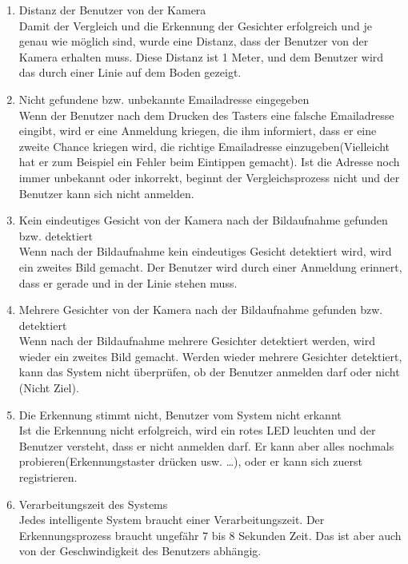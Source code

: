 \begin{enumerate}
	\item Distanz der Benutzer von der Kamera \\
	
	Damit der Vergleich und die Erkennung der Gesichter erfolgreich und je genau wie möglich sind, wurde eine Distanz, dass der Benutzer von der Kamera erhalten muss. Diese Distanz ist 1 Meter, und dem Benutzer wird das durch einer Linie auf dem Boden gezeigt.
	\item Nicht gefundene bzw. unbekannte Emailadresse eingegeben \\
	
	Wenn der Benutzer nach dem Drucken des Tasters eine falsche Emailadresse eingibt, wird er eine Anmeldung kriegen, die ihm informiert, dass er eine zweite Chance kriegen wird, die richtige Emailadresse einzugeben(Vielleicht hat er zum Beispiel ein Fehler beim Eintippen gemacht). Ist die Adresse noch immer unbekannt oder inkorrekt, beginnt der Vergleichsprozess nicht und der Benutzer kann sich nicht anmelden.
	\item Kein eindeutiges Gesicht von der Kamera nach der Bildaufnahme gefunden bzw. detektiert \\
	
	Wenn nach der Bildaufnahme kein eindeutiges Gesicht detektiert wird, wird ein zweites Bild gemacht. Der Benutzer wird durch einer Anmeldung erinnert, dass er gerade und in der Linie stehen muss.
	\item Mehrere Gesichter von der Kamera nach der Bildaufnahme gefunden bzw. detektiert \\
	
	Wenn nach der Bildaufnahme mehrere Gesichter detektiert werden, wird wieder ein zweites Bild gemacht. Werden wieder mehrere Gesichter detektiert, kann das System nicht überprüfen, ob der Benutzer anmelden darf oder nicht (Nicht Ziel).
	\item Die Erkennung stimmt nicht, Benutzer vom System nicht erkannt \\
	
	Ist die Erkennung nicht erfolgreich, wird ein rotes LED leuchten und der Benutzer versteht, dass er nicht anmelden darf. Er kann aber alles nochmals probieren(Erkennungstaster drücken usw. …), oder er kann sich zuerst registrieren.
	\item Verarbeitungszeit des Systems \\
	
	Jedes intelligente System braucht einer Verarbeitungszeit. Der Erkennungsprozess braucht ungefähr 7 bis 8 Sekunden Zeit. Das ist aber auch von der Geschwindigkeit des Benutzers abhängig.
\end{enumerate}
